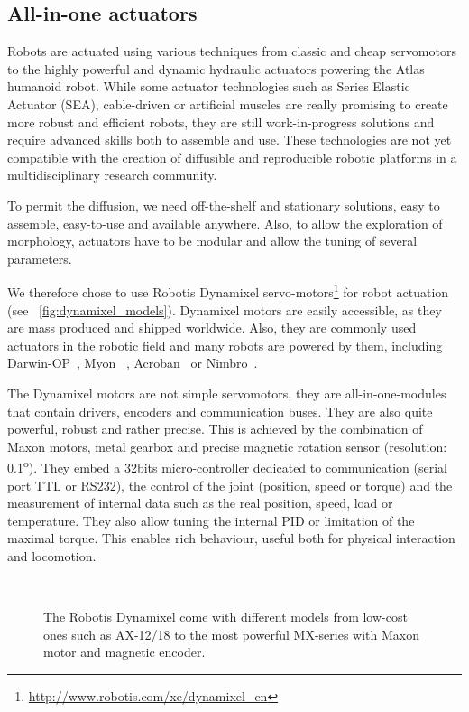 \subsection{All-in-one actuators} %

Robots are actuated using various techniques from classic and cheap servomotors to the highly powerful and dynamic hydraulic actuators powering the Atlas humanoid robot.
While some actuator technologies such as Series Elastic Actuator (SEA), cable-driven or artificial muscles are really promising to create more robust and efficient robots, they are still work-in-progress solutions and require advanced skills both to assemble and use. These technologies are not yet compatible with the creation of diffusible and reproducible robotic platforms in a multidisciplinary research community.

To permit the diffusion, we need off-the-shelf and stationary solutions, easy to assemble, easy-to-use and available anywhere. Also, to allow the exploration of morphology, actuators have to be modular and allow the tuning of several parameters.

We therefore chose to use Robotis Dynamixel servo-motors\footnote{\url{http://www.robotis.com/xe/dynamixel_en}} for robot actuation (see \figurename~\ref{fig:dynamixel_models}). Dynamixel motors are easily accessible, as they are mass produced and shipped worldwide. Also, they are commonly used actuators in the robotic field and many robots are powered by them, including Darwin-OP~\parencite{ha2011development}, Myon~\parencite{hild2012myon} , Acroban~\parencite{ly2011bio} or Nimbro~\parencite{schwarznimbro}.

The Dynamixel motors are not simple servomotors, they are all-in-one-modules that contain drivers, encoders and communication buses. They are also quite powerful, robust and rather precise. This is achieved by the combination of Maxon motors, metal gearbox and precise magnetic rotation sensor (resolution: 0.1\textsuperscript{o}). They embed a 32bits micro-controller dedicated to communication (serial port TTL or RS232), the control of the joint (position, speed or torque) and the measurement of internal data such as the real position, speed, load or temperature. They also allow tuning the internal PID or limitation of the maximal torque. This enables rich behaviour, useful both for physical interaction and locomotion.


\begin{figure}[tb]
\centering
    \hfil
    \\
    \caption{The Robotis Dynamixel come with different models from low-cost ones such as AX-12/18 to the most powerful MX-series with Maxon motor and magnetic encoder.}
    \label{fig:dynamixel_serie}
\end{figure}

